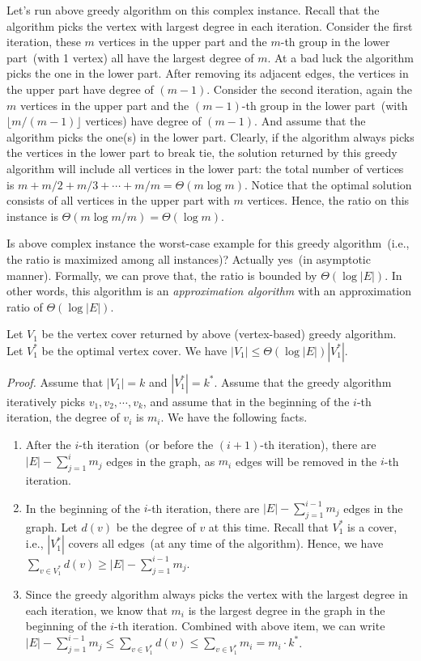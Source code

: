 Let's run above greedy algorithm on this complex instance.
Recall that the algorithm picks the vertex with largest degree in
each iteration. %
Consider the first iteration, 
these $m$ vertices in the upper part and the $m$-th group in the lower part~(with 1 vertex)
all have the largest degree of $m$.
At a bad luck the algorithm picks the one in the lower part.
After removing its adjacent edges, the vertices in the upper part
have degree of $(m-1)$.
Consider the second iteration,
again the $m$ vertices in the upper part and the $(m-1)$-th group in the lower part~(with $\lfloor m/(m-1) \rfloor$ vertices)
have degree of $(m-1)$.
And assume that the algorithm picks the one(s) in the lower part.
Clearly, if the algorithm always picks the vertices in the lower part
to break tie, the solution returned by this greedy algorithm will include all vertices in the lower part: the total
number of vertices is $m + m/2 + m/3 + \cdots + m/m = \Theta(m\log m)$.
Notice that the optimal solution consists of all vertices in the upper part with $m$ vertices.
Hence, the ratio on this instance is $\Theta(m\log m / m) = \Theta(\log m)$.

Is above complex instance the worst-case example for this greedy algorithm~(i.e.,
the ratio is maximized among all instances)?
Actually yes~(in asymptotic manner).
Formally, we can prove that, the ratio is bounded by $\Theta(\log |E|)$. In
other words, this algorithm is an \emph{approximation algorithm} with an approximation
ratio of $\Theta(\log |E|)$.
\begin{fact}
Let $V_1$ be the vertex cover returned by above (vertex-based) greedy algorithm.
Let $V_1^*$ be the optimal vertex cover.
We have $|V_1| \le \Theta(\log |E|) |V_1^*|$.
\end{fact}
\emph{Proof.}
Assume that $|V_1| = k$ and $|V_1^*| = k^*$.
Assume that the greedy algorithm iteratively picks $v_1, v_2, \cdots, v_k$,
and assume that in the beginning of the $i$-th iteration, the degree of $v_i$ is $m_i$.  We have the following facts.
\begin{enumerate}
\item After the $i$-th iteration~(or before the $(i+1)$-th iteration),
there are $|E| - \sum_{j=1}^i m_j$ edges in the graph,
as $m_i$ edges will be removed in the $i$-th iteration.
\item In the beginning of the $i$-th iteration,
there are $|E| - \sum_{j=1}^{i-1} m_j$ edges in the graph.
Let $d(v)$ be the degree of $v$ at this time. 
Recall that $V_1^*$ is a cover, i.e., $|V_1^*|$ covers all edges~(at any time of the algorithm). 
Hence, we have $\sum_{v\in V_1^*} d(v) \ge |E| - \sum_{j=1}^{i-1} m_j$.
\item Since the greedy algorithm always picks the vertex
with the largest degree in each iteration, we know that $m_i$ is the largest 
degree in the graph in the beginning of the $i$-th iteration.
Combined with above item, we can write $|E| - \sum_{j=1}^{i-1} m_j \le \sum_{v\in V_1^*} d(v) \le \sum_{v\in V_1^*} m_i = m_i \cdot k^*$.
\end{enumerate}

